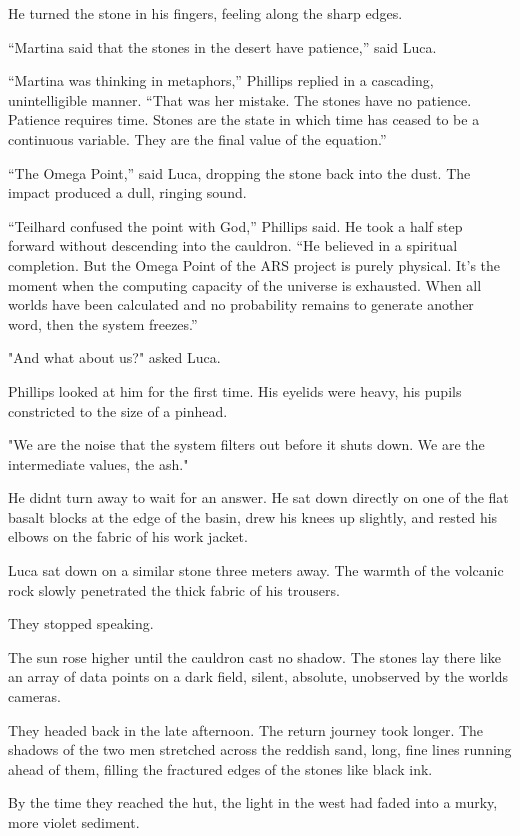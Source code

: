\documentclass[
  ngerman,
]{article}
\begin{document}
He turned the stone in his fingers, feeling along the sharp edges.

``Martina said that the stones in the desert have patience,'' said Luca.

``Martina was thinking in metaphors,'' Phillips replied in a cascading,
unintelligible manner. ``That was her mistake. The stones have no
patience. Patience requires time. Stones are the state in which time has
ceased to be a continuous variable. They are the final value of the
equation.''

``The Omega Point,'' said Luca, dropping the stone back into the dust.
The impact produced a dull, ringing sound.

``Teilhard confused the point with God,'' Phillips said. He took a half
step forward without descending into the cauldron. ``He believed in a
spiritual completion. But the Omega Point of the ARS project is purely
physical. It's the moment when the computing capacity of the universe is
exhausted. When all worlds have been calculated and no probability
remains to generate another word, then the system freezes.''

"And what about us?" asked Luca.

Phillips looked at him for the first time. His eyelids were heavy, his
pupils constricted to the size of a pinhead.

"We are the noise that the system filters out before it shuts down. We
are the intermediate values, the ash."

He didn\textquotesingle t turn away to wait for an answer. He sat down
directly on one of the flat basalt blocks at the edge of the basin, drew
his knees up slightly, and rested his elbows on the fabric of his work
jacket.

Luca sat down on a similar stone three meters away. The warmth of the
volcanic rock slowly penetrated the thick fabric of his trousers.

They stopped speaking.

The sun rose higher until the cauldron cast no shadow. The stones lay
there like an array of data points on a dark field, silent, absolute,
unobserved by the world\textquotesingle s cameras.

They headed back in the late afternoon. The return journey took longer.
The shadows of the two men stretched across the reddish sand, long, fine
lines running ahead of them, filling the fractured edges of the stones
like black ink.

By the time they reached the hut, the light in the west had faded into a
murky, more violet sediment.
\end{document}
